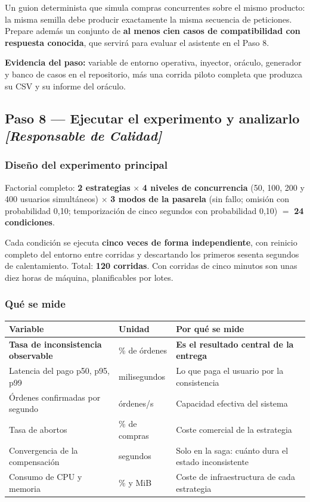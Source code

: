\documentclass[11pt,a4paper]{article}
\newcommand{\paso}[1]{\subsection{#1}}
\begin{document}
	Un guion determinista que simula compras concurrentes sobre el mismo producto: la misma semilla debe producir exactamente la misma secuencia de peticiones. Prepare además un conjunto de \textbf{al menos cien casos de compatibilidad con respuesta conocida}, que servirá para evaluar el asistente en el Paso 8.
	
	\textbf{Evidencia del paso:} variable de entorno operativa, inyector, oráculo, generador y banco de casos en el repositorio, más una corrida piloto completa que produzca su CSV y su informe del oráculo.
	
	\paso{Paso 8 --- Ejecutar el experimento y analizarlo \emph{[Responsable de Calidad]}}
	
	\subsubsection{Diseño del experimento principal}
	
	Factorial completo: \textbf{2 estrategias} $\times$ \textbf{4 niveles de concurrencia} (50, 100, 200 y 400 usuarios simultáneos) $\times$ \textbf{3 modos de la pasarela} (sin fallo; omisión con probabilidad 0,10; temporización de cinco segundos con probabilidad 0,10) $=$ \textbf{24 condiciones}.
	
	Cada condición se ejecuta \textbf{cinco veces de forma independiente}, con reinicio completo del entorno entre corridas y descartando los primeros sesenta segundos de calentamiento. Total: \textbf{120 corridas}. Con corridas de cinco minutos son unas diez horas de máquina, planificables por lotes.
	
	\subsubsection{Qué se mide}
	
	\begin{center}
		\small
		\begin{tabular}{@{}p{5.0cm}p{3.2cm}p{6.4cm}@{}}
			\toprule
			\textbf{Variable} & \textbf{Unidad} & \textbf{Por qué se mide} \\
			\midrule
			\textbf{Tasa de inconsistencia observable} & \% de órdenes & \textbf{Es el resultado central de la entrega} \\
			Latencia del pago p50, p95, p99 & milisegundos & Lo que paga el usuario por la consistencia \\
			Órdenes confirmadas por segundo & órdenes/s & Capacidad efectiva del sistema \\
			Tasa de abortos & \% de compras & Coste comercial de la estrategia \\
			Convergencia de la compensación & segundos & Solo en la saga: cuánto dura el estado inconsistente \\
			Consumo de CPU y memoria & \% y MiB & Coste de infraestructura de cada estrategia \\
			\bottomrule
		\end{tabular}
	\end{center}
	
\end{document}

